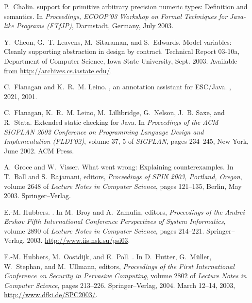 \documentclass{article}
\begin{document}
\begin{thebibliography}{10}
P.~Chalin.
 support for primitive arbitrary precision numeric types:
  Definition and semantics.
\newblock In {\em Proceedings, {ECOOP'03} Workshop on Formal Techniques for
  Java-like Programs ({FTfJP})}, Darmstadt, Germany, July 2003.

Y.~Cheon, G.~T. Leavens, M.~Sitaraman, and S.~Edwards.
\newblock Model variables: Cleanly supporting abstraction in design by
  contract.
\newblock Technical Report 03-10a, Department of Computer Science, Iowa State
  University, Sept. 2003.
\newblock Available from \url{http://archives.cs.iastate.edu/}.

C.~Flanagan and K.~R.~M. Leino.
, an annotation assistant for {ESC/Java}.
, 2021, 2001.

C.~Flanagan, K.~R.~M. Leino, M.~Lillibridge, G.~Nelson, J.~B. Saxe, and
  R.~Stata.
\newblock Extended static checking for {Java}.
\newblock In {\em Proceedings of the {ACM} {SIGPLAN} 2002 Conference on
  Programming Language Design and Implementation ({PLDI}'02)}, volume 37, 5 of
  {\em SIGPLAN}, pages 234--245, New York, June 2002. ACM Press.

A.~Groce and W.~Visser.
\newblock What went wrong: Explaining counterexamples.
\newblock In T.~Ball and S.~Rajamani, editors, {\em Proceedings of SPIN 2003,
  Portland, Oregon}, volume 2648 of {\em Lecture Notes in Computer Science},
  pages 121--135, Berlin, May 2003. Springer--Verlag.

E.-M. Hubbers.
.
\newblock In M.~Broy and A.~Zamulin, editors, {\em {Proceedings of the Andrei
  Ershov Fifth International Conference Perspectives of System Informatics}},
  volume 2890 of {\em Lecture Notes in Computer Science}, pages 214--221.
  Springer--Verlag, 2003.
\newblock \url{http://www.iis.nsk.su/psi03}.

E.-M. Hubbers, M.~Oostdijk, and E.~Poll.
.
\newblock In D.~Hutter, G.~M{\"u}ller, W.~Stephan, and M.~Ullmann, editors,
  {\em {Proceedings of the First International Conference on Security in
  Pervasive Computing}}, volume 2802 of {\em Lecture Notes in Computer
  Science}, pages 213--226. Springer--Verlag, 2004.
\newblock March 12--14, 2003, \url{http://www.dfki.de/SPC2003/}.


\end{thebibliography}
\end{document}
